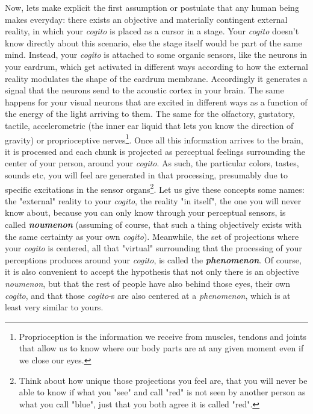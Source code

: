 \documentclass[11pt, a4paper]{article} %
\begin{document}
Now, lets make explicit the first assumption or postulate that any human being makes everyday: there exists an objective and materially contingent external reality, in which your {\em cogito} is placed as a cursor in a stage. Your {\em cogito} doesn't know directly about this scenario, else the stage itself would be part of the same mind. Instead, your {\em cogito} is attached to some organic sensors, like the neurons in your eardrum, which get activated in different ways according to how the external reality modulates the shape of the eardrum membrane. Accordingly it generates a signal that the neurons send to the acoustic cortex in your brain. The same happens for your visual neurons that are excited in different ways as a function of the energy of the light arriving to them. The same for the olfactory, gustatory, tactile, accelerometric (the inner ear liquid that lets you know the direction of gravity) or proprioceptive nerves\footnote{Proprioception is the information we receive from muscles, tendons and joints that allow us to know where our body parts are at any given moment even if we close our eyes.}. Once all this information arrives to the brain, it is processed and each chunk is projected as perceptual feelings surrounding the center of your person, around your {\em cogito}. As such, the particular colors, tastes, sounds etc, you will feel are generated in that processing, presumably due to specific excitations in the sensor organs\footnote{Think about how unique those projections you feel are, that you will never be able to know if what you "see" and call "red" is not seen by another person as what you call "blue", just that you both agree it is called "red".}. Let us give these concepts some names: the "external" reality to your {\em cogito}, the reality "in itself", the one you will never know about, because you can only know through your perceptual sensors, is called {\em \bf noumenon} (assuming of course, that such a thing objectively exists with the same certainty as your own {\em cogito}). Meanwhile, the set of projections where your {\em cogito} is centered, all that "virtual" surrounding that the processing of your perceptions produces around your {\em cogito}, is called the {\em \bf phenomenon}. Of course, it is also convenient to accept the hypothesis that not only there is an objective {\em noumenon}, but that the rest of people have also behind those eyes, their own {\em cogito}, and that those {\em cogito}-s are also centered at a {\em phenomenon}, which is at least very similar to yours.
\end{document}
